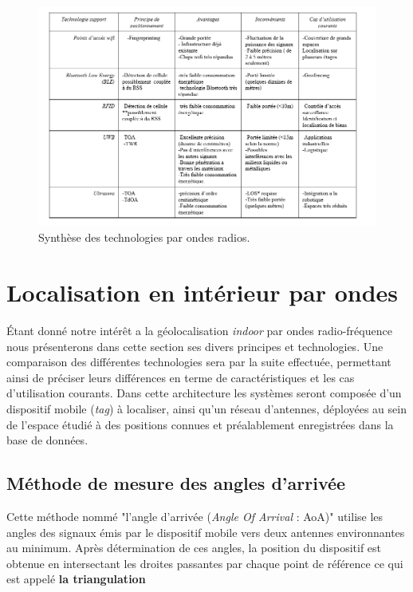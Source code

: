 \documentclass[12pt,a4paper]{report}
\begin{document}
	\begin{figure}[H]
	\centering
	\includegraphics[width=1.1\linewidth]{Pics/technologies.PNG}
	\caption{Synthèse des technologies par ondes radios.}
	\label{fig:technologies}
	
\end{figure}



\section{Localisation en intérieur par ondes }


Étant donné notre intérêt a la géolocalisation \textit{indoor} par ondes radio-fréquence nous présenterons dans cette section ses divers principes et technologies. 
Une comparaison des différentes technologies sera par la suite effectuée, permettant ainsi de préciser leurs différences en terme de caractéristiques et les cas d’utilisation courants.
Dans cette architecture les systèmes seront composée d’un dispositif mobile (\textit{tag}) à localiser, ainsi qu'un réseau d’antennes, déployées au sein de l’espace étudié à des positions connues et préalablement enregistrées dans la base de données.

\subsection{Méthode de mesure des angles d’arrivée}

Cette méthode nommé "l’angle d’arrivée (\textit{Angle Of Arrival} : AoA)" utilise les angles des signaux émis par le dispositif mobile vers deux antennes environnantes au minimum.
Après détermination de ces angles, la position du dispositif est obtenue en intersectant les droites passantes par chaque point de référence ce qui est appelé \textbf{la triangulation}
\end{document}
